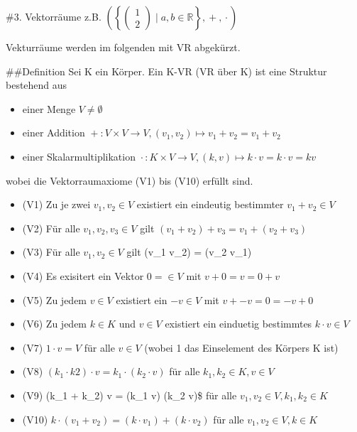 \documentclass{../tudscript}
\begin{document}
\newcommand{\ilmath}[1]{\begin{flalign*}#1\end{flalign*}}
\newcommand{\vect}[1]{\begin{pmatrix}#1\end{pmatrix}}

\#3. Vektorräume z.B.
\(\left(\left\{\begin{pmatrix}1\\2\end{pmatrix} \mid a,b \in \mathbb{R}\right\}, \boxed{+}, \boxed{\cdot}\right)\)

Vekturräume werden im folgenden mit VR abgekürzt.

\#\#Definition Sei K ein Körper. Ein K-VR (VR über K) ist eine Struktur
bestehend aus

\begin{itemize}
\tightlist
\item
  einer Menge \(V \neq \emptyset\)
\item
  einer Addition
  \(\boxed{+}: V \times V \rightarrow V, (v_1, v_2) \mapsto v_1 \boxed{+} v_2 = v_1 + v_2\)
\item
  einer Skalarmultiplikation
  \(\boxed{\cdot}: K \times V \rightarrow V, (k, v) \mapsto k \boxed{\cdot} v = k \cdot v = kv\)
\end{itemize}

wobei die Vektorraumaxiome (V1) bis (V10) erfüllt sind.

\begin{itemize}
\tightlist
\item
  (V1) Zu je zwei \(v_1, v_2 \in V\) existiert ein eindeutig bestimmter
  \(v_1 \boxed{+} v_2 \in V\)
\item
  (V2) Für alle \(v_1,v_2,v_3 \in V\) gilt
  \((v_1 \boxed{+} v_2) \boxed{+} v_3 = v_1 \boxed{+} (v_2 \boxed{+} v_3)\)\\
\item
  (V3) Für alle \(v_1,v_2 \in V\) gilt (v\_1 \boxed{+} v\_2) = (v\_2
  \boxed{+} v\_1)
\item
  (V4) Es exisitert ein Vektor \(0 = \in V\) mit
  \(v \boxed{+} 0 = v = 0 \boxed{+} v\)
\item
  (V5) Zu jedem \(v \in V\) existiert ein \(\boxed{-v} \in V\) mit
  \(v \boxed{+} \boxed{-v} = 0 = \boxed{-v} \boxed{+} 0\)
\item
  (V6) Zu jedem \(k \in K\) und \(v \in V\) existiert ein einduetig
  bestimmtes \(k \boxed{\cdot} v \in V\)
\item
  (V7) \(1 \boxed{\cdot} v = V\) für alle \(v \in V\) (wobei 1 das
  Einselement des Körpers K ist)
\item
  (V8)
  \((k_1 \cdot k2) \boxed{\cdot} v = k_1 \boxed{\cdot} (k_2 \boxed{\cdot} v)\)
  für alle \(k_1, k_2 \in K, v \in V\)
\item
  (V9) (k\_1 + k\_2) \boxed{\cdot} v = (k\_1 \boxed{\cdot} v) \boxed{+}
  (k\_2 \boxed{\cdot} v)\$ für alle \(v_1, v_2 \in V, k_1, k_2 \in K\)
\item
  (V10)
  \(k \boxed{\cdot} (v_1 \boxed{+} v_2) = (k \boxed{\cdot} v_1) \boxed{+} (k \boxed{\cdot} v_2)\)
  für alle \(v_1, v_2 \in V, k \in K\)
\end{itemize}
\end{document}
